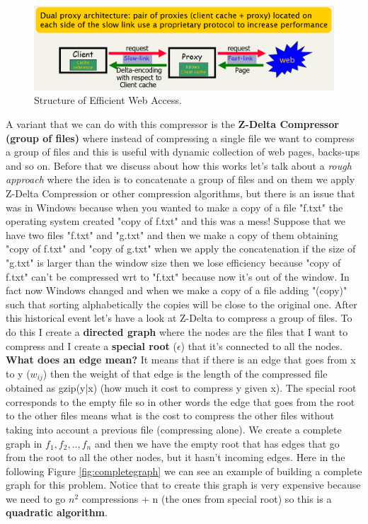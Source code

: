 \begin{figure}
    \centering
    \includegraphics[width=0.75\linewidth]{images/efficientwebaccess.PNG}
    \caption{Structure of Efficient Web Access.}
    \label{fig:efficientwebaccess}
\end{figure}
A variant that we can do with this compressor is the \textbf{Z-Delta Compressor (group of files)} where instead of compressing a single file we want to compress a group of files and this is useful with dynamic collection of web pages, backs-ups and so on.\newline
Before that we discuss about how this works let's talk about a \textit{rough approach} where the idea is to concatenate a group of files and on them we apply Z-Delta Compression or other compression algorithms, but there is an issue that was in Windows because when you wanted to make a copy of a file "f.txt" the operating system created "copy of f.txt" and this was a mess! Suppose that we have two files "f.txt" and "g.txt" and then we make a copy of them obtaining "copy of f.txt" and "copy of g.txt" when we apply the concatenation if the size of "g.txt" is larger than the window size then we lose efficiency because "copy of f.txt" can't be compressed wrt to "f.txt" because now it's out of the window. In fact now Windows changed and when we make a copy of a file adding "(copy)" such that sorting alphabetically the copies will be close to the original one.\newline
After this historical event let's have a look at Z-Delta to compress a group of files. To do this I create a \textbf{directed graph} where the nodes are the files that I want to compress and I create a \textbf{special root} ($\epsilon$) that it's connected to all the nodes.\newline
\textbf{What does an edge mean?} It means that if there is an edge that goes from x to y ($w_{ij}$) then the weight of that edge is the length of the compressed file obtained as gzip(y|x) (how much it cost to compress y given x). The special root corresponds to the empty file so in other words the edge that goes from the root to the other files means what is the cost to compress the other files without taking into account a previous file (compressing alone). We create a complete graph in $f_1,f_2,..,f_n$ and then we have the empty root that has edges that go from the root to all the other nodes, but it hasn't incoming edges. Here in the following Figure \ref{fig:completegraph} we can see an example of building a complete graph for this problem. Notice that to create this graph is very expensive because we need to go $n^2$ compressions + n (the ones from special root) so this is a \textbf{quadratic algorithm}.\newline
